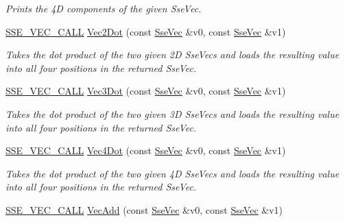 \begin{DoxyCompactItemize}
\begin{DoxyCompactList}\small\item\em Prints the 4\+D components of the given Sse\+Vec. \end{DoxyCompactList}\item 
\hyperlink{ssevec__math__defs_8h_a97454f977a5281455cecacce1e8ba670}{S\+S\+E\+\_\+\+V\+E\+C\+\_\+\+C\+A\+L\+L} \hyperlink{group___s_i_m_d_vec_math_ga4901bdfc9b7b47cc1a5a99b28cd28c34}{Vec2\+Dot} (const \hyperlink{namespacegfxmath_a0de2243e2b8d0fd46d3af5e036423004}{Sse\+Vec} \&v0, const \hyperlink{namespacegfxmath_a0de2243e2b8d0fd46d3af5e036423004}{Sse\+Vec} \&v1)
\begin{DoxyCompactList}\small\item\em Takes the dot product of the two given 2\+D Sse\+Vecs and loads the resulting value into all four positions in the returned Sse\+Vec. \end{DoxyCompactList}\item 
\hyperlink{ssevec__math__defs_8h_a97454f977a5281455cecacce1e8ba670}{S\+S\+E\+\_\+\+V\+E\+C\+\_\+\+C\+A\+L\+L} \hyperlink{group___s_i_m_d_vec_math_ga3bf827d8c460ecc3cf412120d53fffbc}{Vec3\+Dot} (const \hyperlink{namespacegfxmath_a0de2243e2b8d0fd46d3af5e036423004}{Sse\+Vec} \&v0, const \hyperlink{namespacegfxmath_a0de2243e2b8d0fd46d3af5e036423004}{Sse\+Vec} \&v1)
\begin{DoxyCompactList}\small\item\em Takes the dot product of the two given 3\+D Sse\+Vecs and loads the resulting value into all four positions in the returned Sse\+Vec. \end{DoxyCompactList}\item 
\hyperlink{ssevec__math__defs_8h_a97454f977a5281455cecacce1e8ba670}{S\+S\+E\+\_\+\+V\+E\+C\+\_\+\+C\+A\+L\+L} \hyperlink{group___s_i_m_d_vec_math_gad3272988dd3696dda1f0e8dc4737884d}{Vec4\+Dot} (const \hyperlink{namespacegfxmath_a0de2243e2b8d0fd46d3af5e036423004}{Sse\+Vec} \&v0, const \hyperlink{namespacegfxmath_a0de2243e2b8d0fd46d3af5e036423004}{Sse\+Vec} \&v1)
\begin{DoxyCompactList}\small\item\em Takes the dot product of the two given 4\+D Sse\+Vecs and loads the resulting value into all four positions in the returned Sse\+Vec. \end{DoxyCompactList}\item 
\hyperlink{ssevec__math__defs_8h_a97454f977a5281455cecacce1e8ba670}{S\+S\+E\+\_\+\+V\+E\+C\+\_\+\+C\+A\+L\+L} \hyperlink{group___s_i_m_d_vec_math_gac4d06ed829409cb54c1a58dbcae58c11}{Vec\+Add} (const \hyperlink{namespacegfxmath_a0de2243e2b8d0fd46d3af5e036423004}{Sse\+Vec} \&v0, const \hyperlink{namespacegfxmath_a0de2243e2b8d0fd46d3af5e036423004}{Sse\+Vec} \&v1)

\end{DoxyCompactItemize}
